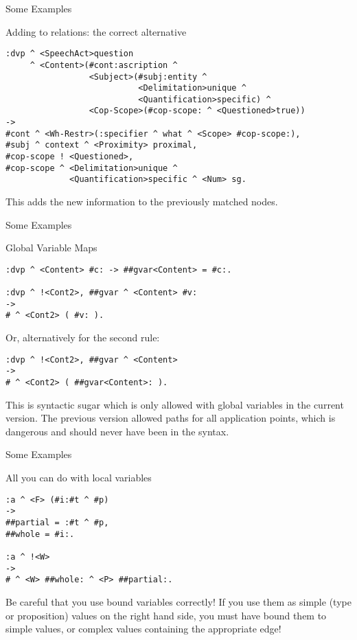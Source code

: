 \documentclass{beamer}
\begin{document}
\begin{frame}[fragile]{Some Examples}
\begin{block}{Adding to relations: the correct alternative}\small
\vspace*{-2.5ex}%
\begin{verbatim}
:dvp ^ <SpeechAct>question
     ^ <Content>(#cont:ascription ^
                 <Subject>(#subj:entity ^
                           <Delimitation>unique ^
                           <Quantification>specific) ^
                 <Cop-Scope>(#cop-scope: ^ <Questioned>true))
->
#cont ^ <Wh-Restr>(:specifier ^ what ^ <Scope> #cop-scope:),
#subj ^ context ^ <Proximity> proximal,
#cop-scope ! <Questioned>,
#cop-scope ^ <Delimitation>unique ^
             <Quantification>specific ^ <Num> sg.
\end{verbatim}
\end{block}

This adds the new information to the previously matched nodes.
\end{frame}


\begin{frame}[fragile]{Some Examples}
\begin{block}{Global Variable Maps}\small
\vspace*{-2.5ex}%
\begin{verbatim}
:dvp ^ <Content> #c: -> ##gvar<Content> = #c:.

:dvp ^ !<Cont2>, ##gvar ^ <Content> #v:
->
# ^ <Cont2> ( #v: ).
\end{verbatim}
Or, alternatively for the second rule:
\begin{verbatim}
:dvp ^ !<Cont2>, ##gvar ^ <Content>
->
# ^ <Cont2> ( ##gvar<Content>: ).
\end{verbatim}
\end{block}

This is syntactic sugar which is only allowed with global variables in the
current version. The previous version allowed paths for all application points,
which is dangerous and should never have been in the syntax.
\end{frame}


\begin{frame}[fragile]{Some Examples}
\begin{block}{All you can do with local variables}\small
\vspace*{-2.5ex}%
\begin{verbatim}
:a ^ <F> (#i:#t ^ #p)
->
##partial = :#t ^ #p,
##whole = #i:.

:a ^ !<W>
->
# ^ <W> ##whole: ^ <P> ##partial:.
\end{verbatim}
\end{block}
Be careful that you use bound variables correctly! If you use them as simple
(type or proposition) values on the right hand side, you must have bound them
to simple values, or complex values containing the appropriate edge!
\end{frame}
\end{document}
